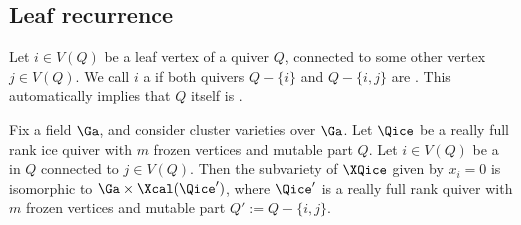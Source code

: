 \subsection{Leaf recurrence}
%
Let $i\in V(Q)$ be a leaf vertex of a quiver $Q$, connected to some other vertex $j\in V(Q)$. We call $i$ a \emph{\Louiseleaf} if both quivers $Q-\{i\}$ and $Q-\{i,j\}$ are \Louise.  This automatically implies that $Q$ itself is \Louise.

%

\begin{proposition}\label{prop:Louise_leaf}
Fix a field $\Ga$, and consider cluster varieties over $\Ga$.
Let $\Qice$ be a really full rank ice quiver with $m$ frozen vertices and mutable part $Q$. Let $i\in V(Q)$ be a \Louiseleaf in $Q$ connected to $j\in V(Q)$. Then the subvariety of $\XQice$ given by $x_i=0$ is isomorphic to $\Ga\times \Xcal(\Qice')$, where $\Qice'$ is a really full rank quiver with $m$ frozen vertices and mutable part $Q':=Q-\{i,j\}$.
\end{proposition}
